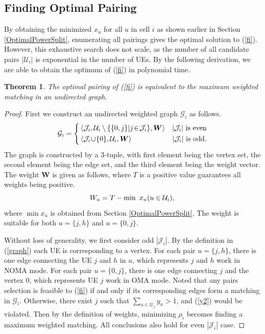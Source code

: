 \documentclass[10pt,journal,final,finalsubmission,twocolumn]{IEEEtran}
\newtheorem{theorem}{Theorem}
\begin{document}
 
\subsection{Finding Optimal Pairing}

By obtaining the minimized $x_u$ for all $u$ in cell $i$ as shown earlier in Section \ref{OptimalPowerSplit}, enumerating all pairings gives the optimal solution to (\ref{fi}). However, this exhaustive search does not scale, as the number of all candidate pairs $|\mathcal{U}_i |$ is exponential in the number of UEs. By the following derivation, we are able to obtain the optimum of (\ref{fi}) in polynomial time.

\begin{theorem}
The optimal pairing of (\ref{fi}) is equivalent to the maximum weighted matching in an undirected graph.
\end{theorem}
\begin{proof}
First we construct an undirected weighted graph $\mathcal{G}_i$ as follows. 
\begin{equation}\label{graph}
\mathcal{G}_i=\left\{
\begin{aligned}
&\left \langle\mathcal{J}_i, \mathcal{U}_i \setminus \{\{0,j\}|j\!\in\!\mathcal{J}_i \}, \boldsymbol{W}\right \rangle&|\mathcal{J}_i|{\rm\ is\ even}\\
&\left \langle\mathcal{J}_i\!\cup\!\{0 \}, \mathcal{U}_i, \boldsymbol{W}\right \rangle&|\mathcal{J}_i|{\rm\ is\ odd}.\end{aligned}
\right.
\end{equation}
The graph is constructed by a 3-tuple, with first element being the vertex set, the second element being the edge set, and the third element being the weight vector. The weight $\boldsymbol{W}$ is given as follows, where $T$ is a positive value guarantees all weights being positive.
\begin{equation}
W_u = T - {\min\ x_u} (u\in \mathcal{U}_i),\\
\end{equation}
where $\min x_u$ is obtained from Section \ref{OptimalPowerSplit}. The weight is suitable for both $u = \{j,h\}$ and $u=\{0,j\}$.

Without loss of generality, we first consider odd $|\mathcal{J}_i|$. By the definition in (\ref{graph}) each UE is corresponding to a vertex. For each pair $u = \{j,h\}$, there is one edge connecting the UE $j$ and $h$ in $u$, which represents $j$ and $h$ work in NOMA mode. For each pair $u = \{0,j\}$, there is one edge connecting $j$ and the vertex $0$, which represents UE $j$ work in OMA mode. Noted that any pairs selection is feasible to (\ref{fi}) if and only if its corresponding edges form a matching in $\mathcal{G}_i$. Otherwise, there exist $j$ such that $\sum_{u\in \mathcal{U}_j}y_u>1$, and (\ref{y2}) would be violated. Then by the definition of weights, minimizing $\rho_i$ becomes finding a maximum weighted matching. All conclusions also hold for even $|\mathcal{J}_i|$ case.
\end{proof}
\end{document}
